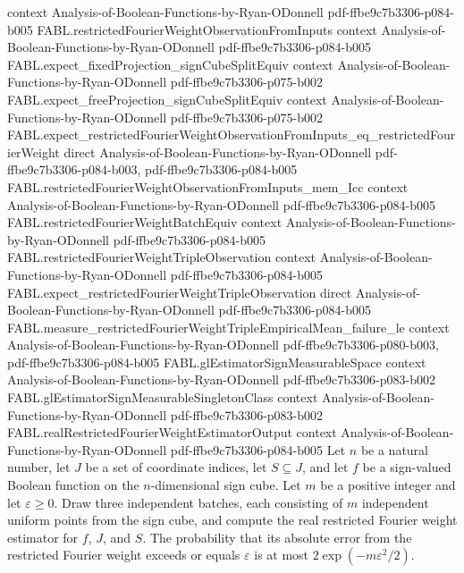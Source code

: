 \begin{theorem}
  {context}
  {Analysis-of-Boolean-Functions-by-Ryan-ODonnell}
  {pdf-ffbe9c7b3306-p084-b005}
\proofstep
  {FABL.restrictedFourierWeightObservationFromInputs}
  {context}
  {Analysis-of-Boolean-Functions-by-Ryan-ODonnell}
  {pdf-ffbe9c7b3306-p084-b005}
\proofstep
  {FABL.expect_fixedProjection_signCubeSplitEquiv}
  {context}
  {Analysis-of-Boolean-Functions-by-Ryan-ODonnell}
  {pdf-ffbe9c7b3306-p075-b002}
\proofstep
  {FABL.expect_freeProjection_signCubeSplitEquiv}
  {context}
  {Analysis-of-Boolean-Functions-by-Ryan-ODonnell}
  {pdf-ffbe9c7b3306-p075-b002}
\proofstep
  {FABL.expect_restrictedFourierWeightObservationFromInputs_eq_restrictedFourierWeight}
  {direct}
  {Analysis-of-Boolean-Functions-by-Ryan-ODonnell}
  {pdf-ffbe9c7b3306-p084-b003,
    pdf-ffbe9c7b3306-p084-b005}
\proofstep
  {FABL.restrictedFourierWeightObservationFromInputs_mem_Icc}
  {context}
  {Analysis-of-Boolean-Functions-by-Ryan-ODonnell}
  {pdf-ffbe9c7b3306-p084-b005}
\proofstep
  {FABL.restrictedFourierWeightBatchEquiv}
  {context}
  {Analysis-of-Boolean-Functions-by-Ryan-ODonnell}
  {pdf-ffbe9c7b3306-p084-b005}
\proofstep
  {FABL.restrictedFourierWeightTripleObservation}
  {context}
  {Analysis-of-Boolean-Functions-by-Ryan-ODonnell}
  {pdf-ffbe9c7b3306-p084-b005}
\proofstep
  {FABL.expect_restrictedFourierWeightTripleObservation}
  {direct}
  {Analysis-of-Boolean-Functions-by-Ryan-ODonnell}
  {pdf-ffbe9c7b3306-p084-b005}
\proofstep
  {FABL.measure_restrictedFourierWeightTripleEmpiricalMean_failure_le}
  {context}
  {Analysis-of-Boolean-Functions-by-Ryan-ODonnell}
  {pdf-ffbe9c7b3306-p080-b003,
    pdf-ffbe9c7b3306-p084-b005}
\proofstep
  {FABL.glEstimatorSignMeasurableSpace}
  {context}
  {Analysis-of-Boolean-Functions-by-Ryan-ODonnell}
  {pdf-ffbe9c7b3306-p083-b002}
\proofstep
  {FABL.glEstimatorSignMeasurableSingletonClass}
  {context}
  {Analysis-of-Boolean-Functions-by-Ryan-ODonnell}
  {pdf-ffbe9c7b3306-p083-b002}
\proofstep
  {FABL.realRestrictedFourierWeightEstimatorOutput}
  {context}
  {Analysis-of-Boolean-Functions-by-Ryan-ODonnell}
  {pdf-ffbe9c7b3306-p084-b005}
Let $n$ be a natural number, let $J$ be a set of coordinate indices, let $S\subseteq J$,
and let $f$ be a sign-valued Boolean function on the $n$-dimensional sign cube. Let $m$
be a positive integer and let $\varepsilon\ge0$. Draw three independent batches, each
consisting of $m$ independent uniform points from the sign cube, and compute the real
restricted Fourier weight estimator for $f$, $J$, and $S$. The probability that its
absolute error from the restricted Fourier weight exceeds or equals $\varepsilon$ is at
most $2\exp(-m\varepsilon^2/2)$.
\end{theorem}

